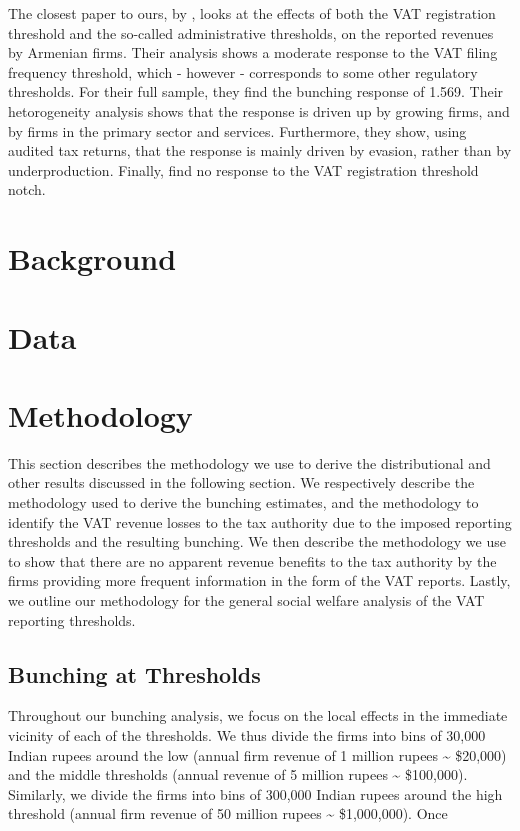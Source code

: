 The closest paper to ours, by \citet{asatryan2017responses}, looks at the effects of both the VAT registration threshold and the so-called administrative thresholds, on the reported revenues by Armenian firms. Their analysis shows a moderate response to the VAT filing frequency threshold, which - however - corresponds to some other regulatory thresholds. For their full sample, they find the bunching response of 1.569. Their hetorogeneity analysis shows that the response is driven up by growing firms, and by firms in the primary sector and services. Furthermore, they show, using audited tax returns, that the response is mainly driven by evasion, rather than by underproduction. Finally, \citet{asatryan2017responses} find no response to the VAT registration threshold notch. 



\section{Background}
\label{sec:background}

\section{Data}
\label{sec:data}



\section{Methodology}
\label{sec:methodology}
This section describes the methodology we use to derive the distributional
and other results discussed in the following section. We respectively
describe the methodology used to derive the bunching estimates, and
the methodology to identify the VAT revenue losses to the tax authority
due to the imposed reporting thresholds and the resulting bunching.
We then describe the methodology we use to show that there are no
apparent revenue benefits to the tax authority by the firms providing
more frequent information in the form of the VAT reports. Lastly,
we outline our methodology for the general social welfare analysis
of the VAT reporting thresholds.

\subsection{Bunching at Thresholds}
\label{subsec:methodology-bunching}

Throughout our bunching analysis, we focus on the local effects in
the immediate vicinity of each of the thresholds. We thus divide the
firms into bins of 30,000 Indian rupees around the low (annual firm
revenue of 1 million rupees \textasciitilde{} \$20,000) and the middle
thresholds (annual revenue of 5 million rupees \textasciitilde{} \$100,000).
Similarly, we divide the firms into bins of 300,000 Indian rupees
around the high threshold (annual firm revenue of 50 million rupees
\textasciitilde{} \$1,000,000). Once

